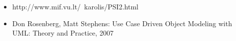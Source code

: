 \documentclass{VUMIFPSkursinis}
\begin{document}
\setcounter{secnumdepth}{4}


	\begin{itemize}
		\item http://www.mif.vu.lt/~karolis/PSI2.html
		\item Don Rosenberg, Matt Stephens: Use Case Driven Object Modeling with UML: Theory and Practice, 2007
	\end{itemize}

\end{document}
